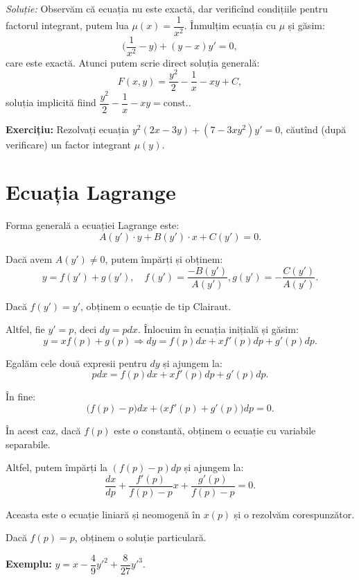 \emph{Soluție:} Observăm că ecuația nu este exactă, dar verificînd condițiile pentru factorul
integrant, putem lua $\mu(x) = \dfrac{1}{x^2}$. Înmulțim ecuația cu $\mu$ și găsim:
\[
  \Big( \frac{1}{x^2} - y \Big) + (y - x)y' = 0,
\]
care este exactă. Atunci putem scrie direct soluția generală:
\[
  F(x, y) = \frac{y^2}{2} - \frac{1}{x} - xy + C,
\]
soluția implicită fiind $\dfrac{y^2}{2} - \dfrac{1}{x} - xy = \text{const.}$.

\vspace{1cm}

\textbf{Exercițiu:} Rezolvați ecuația $y^2 (2x - 3y) + (7 - 3xy^2) y' = 0$, căutînd
(după verificare) un factor integrant $\mu(y)$.


\section{Ecuația Lagrange}
\label{sec:lagr}

Forma generală a ecuației Lagrange este:
\[
  A(y')\cdot y + B(y')\cdot x + C(y') = 0.
\]

Dacă avem $A(y') \neq 0$, putem împărți și obținem:
\[
  y = f(y') + g(y'), \quad f(y') = \frac{- B(y')}{A(y')}, g(y') = -\frac{C(y')}{A(y')}.
\]

Dacă $f(y') = y'$, obținem o ecuație de tip Clairaut.

Altfel, fie $y' = p$, deci $dy = pdx$. Înlocuim în ecuația inițială și găsim:
\[
  y = xf(p) + g(p) \Rightarrow dy = f(p) dx + xf'(p) dp + g'(p) dp.
\]

Egalăm cele două expresii pentru $dy$ și ajungem la:
\[
  pdx = f(p) dx + xf'(p) dp + g'(p) dp.
\]

În fine:
\[
  \big( f(p) - p \big) dx + \big( xf'(p) + g'(p) \big) dp = 0.
\]

În acest caz, dacă $f(p)$ este o constantă, obținem o ecuație cu variabile separabile.

Altfel, putem împărți la $(f(p) - p) dp$ și ajungem la:
\[
  \frac{dx}{dp} + \frac{f'(p)}{f(p) - p} x + \frac{g'(p)}{f(p) - p} = 0.
\]

Aceasta este o ecuație liniară și neomogenă în $x(p)$ și o rezolvăm corespunzător.

Dacă $f(p) = p$, obținem o soluție particulară.

\vspace{1cm}

\textbf{Exemplu:} $y = x - \dfrac{4}{9} {y'}^2 + \dfrac{8}{27} {y'}^3$.


